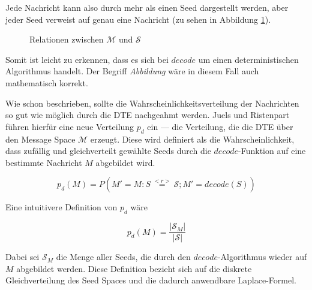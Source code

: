 Jede Nachricht kann also durch mehr als einen Seed dargestellt werden, aber jeder Seed verweist auf genau eine Nachricht (zu sehen in Abbildung \ref{fig:dte}).

\begin{figure}[!h]
\center
{}
\caption{Relationen zwischen $\mathcal{M}$ und $\mathcal{S}$}
\label{fig:dte}
\end{figure}

Somit ist leicht zu erkennen, dass es sich bei $decode$ um einen deterministischen Algorithmus handelt. Der Begriff \emph{Abbildung} wäre in diesem Fall auch mathematisch korrekt.

Wie schon beschrieben, sollte die Wahrscheinlichkeitsverteilung der Nachrichten so gut wie möglich durch die DTE nachgeahmt werden. Juels und Ristenpart \cite{EURO2014} führen hierfür eine neue Verteilung $p_d$ ein --- die Verteilung, die die DTE über den Message Space $\mathcal{M}$ erzeugt. Diese wird definiert als die Wahrscheinlichkeit, dass zufällig und gleichverteilt gewählte Seeds durch die $decode$-Funktion auf eine bestimmte Nachricht $M$ abgebildet wird.

$$p_d(M) = P(M' = M : S \overset{<r>}{=} \mathcal{S} ; M' = decode(S))$$

Eine intuitivere Definition von $p_d$ wäre

$$p_d(M) = \frac{|\mathcal{S}_M|}{|\mathcal{S}|}$$

Dabei sei $\mathcal{S}_M$ die Menge aller Seeds, die durch den $decode$-Algorithmus wieder auf $M$ abgebildet werden. Diese Definition bezieht sich auf die diskrete Gleichverteilung des Seed Spaces und die dadurch anwendbare Laplace-Formel.

